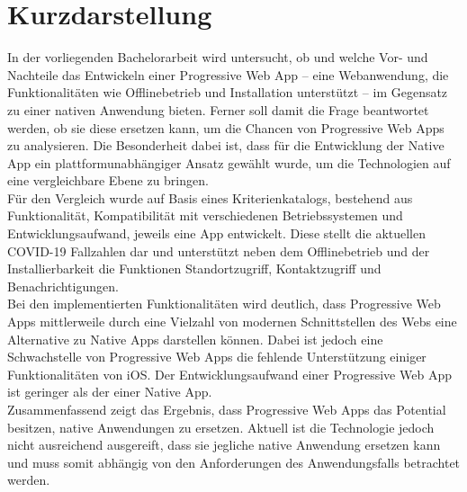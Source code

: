 \thispagestyle{empty}
\section*{Kurzdarstellung}
\label{sec:kurzdarstellung}
In der vorliegenden Bachelorarbeit wird untersucht, ob und welche Vor- und Nachteile das Entwickeln einer Progressive Web App -- eine Webanwendung, die Funktionalitäten wie Offlinebetrieb und Installation unterstützt -- im Gegensatz zu einer nativen Anwendung bieten. 
Ferner soll damit die Frage beantwortet werden, ob sie diese ersetzen kann, um die Chancen von Progressive Web Apps zu analysieren.
Die Besonderheit dabei ist, dass für die Entwicklung der Native App ein plattformunabhängiger Ansatz gewählt wurde, um die Technologien auf eine vergleichbare Ebene zu bringen.\\
Für den Vergleich wurde auf Basis eines Kriterienkatalogs, bestehend aus Funktionalität, Kompatibilität mit verschiedenen Betriebssystemen und Entwicklungsaufwand, jeweils eine App entwickelt.
Diese stellt die aktuellen COVID-19 Fallzahlen dar und unterstützt neben dem Offlinebetrieb und der Installierbarkeit die Funktionen Standortzugriff, Kontaktzugriff und Benachrichtigungen.\\
Bei den implementierten Funktionalitäten wird deutlich, dass Progressive Web Apps mittlerweile durch eine Vielzahl von modernen Schnittstellen des Webs eine Alternative zu Native Apps darstellen können.
Dabei ist jedoch eine Schwachstelle von Progressive Web Apps die fehlende Unterstützung einiger Funktionalitäten von iOS.
Der Entwicklungsaufwand einer Progressive Web App ist geringer als der einer Native App.\\
Zusammenfassend zeigt das Ergebnis, dass Progressive Web Apps das Potential besitzen, native Anwendungen zu ersetzen.
Aktuell ist die Technologie jedoch nicht ausreichend ausgereift, dass sie jegliche native Anwendung ersetzen kann und muss somit abhängig von den Anforderungen des Anwendungsfalls betrachtet werden.